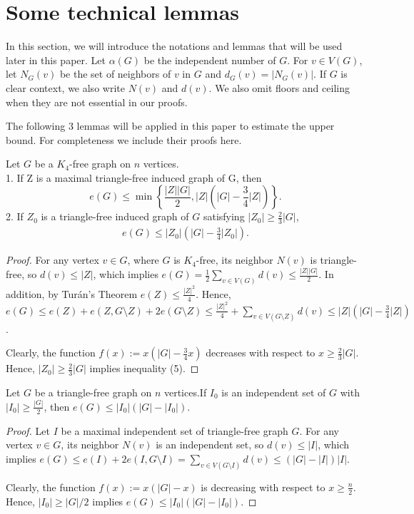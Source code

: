 \documentclass[11pt, oneside]{article}   	%
\begin{document}
\section{Some technical lemmas}

In this section, we will introduce the notations and lemmas that will be used later in this paper. Let $\alpha(G)$ be the independent number of $G$. For $v\in V(G)$, let $N_G(v)$ be the set of neighbors of $v$ in $G$ and $d_G(v)=|N_G(v)|$. If $G$ is clear context, we also write $N(v)$ and $d(v)$. We also omit floors and ceiling when they are not essential in our proofs.

The following 3 lemmas will be applied in this paper to estimate the upper bound. For completeness we include their proofs here.

\begin{lemma}
    Let $G$ be a $K_4$-free graph on $n$ vertices.\\
    1. If Z is a maximal triangle-free induced graph of G, then 
    \begin{equation}
        e(G)\leq \min\left\{\frac{|Z||G|}{2},|Z|(|G|-\frac 3 4|Z|)\right\}.
    \end{equation}    
    2. If $Z_0$ is a triangle-free induced graph of $G$ satisfying $|Z_0|\geq \frac{2}{3}|G|$, 
    \begin{align}
        e(G)\leq |Z_0|(|G|-\frac 3 4|Z_0|).
    \end{align}  
\end{lemma}
\begin{proof}
    For any vertex $v\in G$, where $G$ is $K_4$-free, its neighbor $N(v)$ is triangle-free, so $d(v)\leq |Z|$, which implies $e(G)=\frac{1}{2}\sum\limits_{v\in V(G)}d(v)\leq \frac{|Z||G|}{2}$. In addition, by Turán's Theorem $e(Z)\leq \frac{|Z|^2} 4$. Hence, $e(G)\leq e(Z)+e(Z,G\setminus Z)+2 e(G\setminus Z)\leq \frac{|Z|^2}4+\sum\limits_{v\in V(G\setminus Z)}d(v)\leq |Z|(|G|-\frac 3 4|Z|)$. 
    
    Clearly, the function $f(x):=x(|G|-\frac{3}{4}x)$ decreases with respect to $x\geq \frac{2}{3}|G|$. Hence, $|Z_0|\geq \frac 2 3|G|$ implies inequality (5).
\end{proof}

\begin{lemma}
    Let $G$ be a triangle-free graph on $n$ vertices.If $I_0$ is an independent set of $G$ with $|I_0|\geq \frac{|G|}{2}$, then  $e(G)\leq |I_0|(|G|-|I_0|)$.
\end{lemma}
\begin{proof}
    Let $I$ be a maximal independent set of triangle-free graph $G$. For any vertex $v\in G$, its neighbor $N(v)$ is an independent set, so $d(v)\leq |I|$, which implies $e(G)\leq e(I)+2e(I,G\setminus I)=\sum_{v\in V(G \setminus I)}d(v)\leq (|G|-|I|)|I|$. 
    
    Clearly, the function $f(x):=x(|G|-x)$ is decreasing with respect to $x\geq \frac n 2$. Hence, $|I_0|\geq  |G|/2 $ implies $e(G)\leq |I_0|(|G|-|I_0|)$.
\end{proof}
\end{document}

